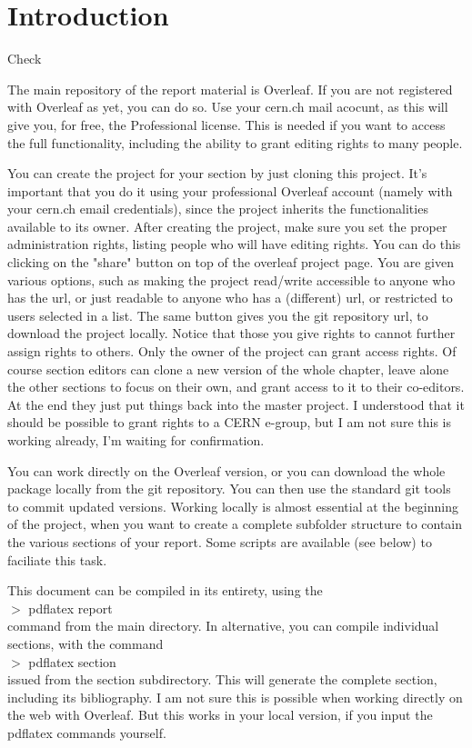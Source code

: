 \documentclass[../report.tex]{subfiles}
\begin{document}
\section{Introduction}

Check

The main repository of the report material is Overleaf. If you are not
registered with Overleaf as yet, you can do so. Use your cern.ch mail
acocunt, as this will give you, for free, the Professional license. This
is needed if you want to access the full functionality, including the
ability to grant editing rights to many people.

You can create the project for your section by just cloning this
project. It's important that you do it using your professional
Overleaf account (namely with your cern.ch email credentials), since
the project inherits the functionalities available to its owner.
After creating the project, make sure you set the proper
administration rights, listing people who will have editing
rights. You can do this clicking on the "share" button on top of the overleaf project page. You are given various options, such as making the project read/write accessible to anyone who has the url, or just readable to anyone who has a (different) url, or restricted to users selected in a list. The same button gives you the git repository url, to download the project locally. Notice that those you give rights to cannot further assign
rights to others. Only the owner of the project can grant access
rights. Of course section editors can clone a new version of the whole
chapter, leave alone the other sections to focus on their own, and
grant access to it to their co-editors. At the end they just put
things back into the master project.  I understood that it should be
possible to grant rights to a CERN e-group, but I am not sure this is
working already, I'm waiting for confirmation.

You can work directly on the Overleaf version, or you can download the
whole package locally from the git repository. You can then use the
standard git tools to commit updated versions. Working locally is
almost essential at the beginning of the project, when you want to
create a complete subfolder structure to contain the various sections
of your report. Some scripts are available (see below) to faciliate
this task.

This document can be compiled in its entirety, using the\\
$>$ pdflatex report\\
command from the main directory. In alternative, you can compile
individual sections, with the command\\
$>$ pdflatex section\\
issued from the section subdirectory. This will generate the complete
section, including its 
bibliography.
I am not sure this is possible when working directly on the web with
Overleaf. But this works in your local version, if you input the
pdflatex commands yourself.
\end{document}
